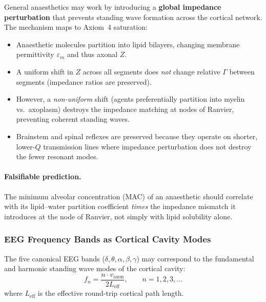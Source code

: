 General anaesthetics may work by introducing a \textbf{global
impedance perturbation} that prevents standing wave formation
across the cortical network.  The mechanism maps to Axiom~4
saturation:

\begin{itemize}
    \item Anaesthetic molecules partition into lipid bilayers,
          changing membrane permittivity $\varepsilon_m$ and
          thus axonal $Z$.
    \item A uniform shift in $Z$ across all segments does
          \emph{not} change relative $\Gamma$ between segments
          (impedance ratios are preserved).
    \item However, a \emph{non-uniform} shift (agents
          preferentially partition into myelin vs.\ axoplasm)
          destroys the impedance matching at nodes of Ranvier,
          preventing coherent standing waves.
    \item Brainstem and spinal reflexes are preserved because
          they operate on shorter, lower-$Q$ transmission
          lines where impedance perturbation does not destroy
          the fewer resonant modes.
\end{itemize}

\paragraph{Falsifiable prediction.}
The minimum alveolar concentration (MAC) of an anaesthetic
should correlate with its lipid--water partition coefficient
\emph{times} the impedance mismatch it introduces at the
node of Ranvier, not simply with lipid solubility alone.

\subsubsection{EEG Frequency Bands as Cortical Cavity Modes}
\label{sec:eeg_modes}

The five canonical EEG bands ($\delta, \theta, \alpha, \beta,
\gamma$) may correspond to the fundamental and harmonic
standing wave modes of the cortical cavity:
\begin{equation}
    f_n = \frac{n \cdot v_\text{axon}}{2 L_\text{eff}},
    \qquad n = 1, 2, 3, \ldots
    \label{eq:cortical_modes}
\end{equation}
where $L_\text{eff}$ is the effective round-trip cortical
path length.

